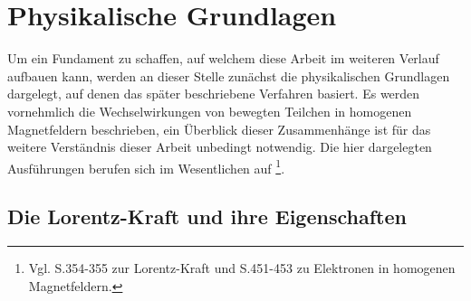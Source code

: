 \chapter{Physikalische Grundlagen}

Um ein Fundament zu schaffen, auf welchem diese Arbeit im weiteren Verlauf aufbauen kann, werden
an dieser Stelle zun\"achst die physikalischen Grundlagen dargelegt, auf denen das sp\"ater beschriebene
Verfahren basiert. Es werden vornehmlich die Wechselwirkungen von bewegten Teilchen in homogenen
Magnetfeldern beschrieben, ein \"Uberblick dieser Zusammenh\"ange ist f\"ur das weitere Verst\"andnis
dieser Arbeit unbedingt notwendig. Die hier dargelegten Ausf\"uhrungen berufen sich im Wesentlichen auf \cite{Vog99}
\footnote{Vgl. S.354-355 zur Lorentz-Kraft und S.451-453 zu Elektronen in homogenen Magnetfeldern.}.

\section{Die Lorentz-Kraft und ihre Eigenschaften}
\label{sec:lorentz}

